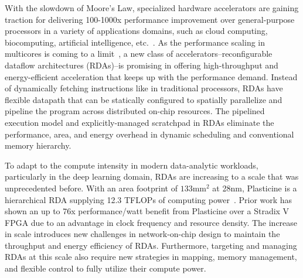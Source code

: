
With the slowdown of Moore’s Law, specialized hardware accelerators are gaining traction
for delivering 100-1000x performance improvement over general-purpose
processors in a variety of applications domains, such as cloud computing, biocomputing, 
artificial intelligence, etc.~\cite{fpgacloudsurvey,bioaccel,genomicaccel}.
As the performance scaling in multicores is coming to a limit~\cite{multicorescale}, a new
class of accelerators--reconfigurable dataflow architectures (RDAs)--is promising in 
offering high-throughput and energy-efficient acceleration that keeps up with the performance demand.
Instead of dynamically fetching instructions like in traditional processors, RDAs have flexible datapath 
that can be statically configured to spatially parallelize and pipeline the program across
distributed on-chip resources. 
The pipelined execution model and explicitly-managed scratchpad in RDAs eliminate
the performance, area, and energy overhead in dynamic scheduling and conventional memory hierarchy.

To adapt to the compute intensity in modern data-analytic workloads, particularly in the deep learning
domain, RDAs are increasing to a scale that was unprecedented before.
With an area footprint of $133\text{mm}^2$ at 28nm, 
Plasticine is a hierarchical RDA supplying 12.3 TFLOPs of computing power~\cite{plasticine}.
Prior work has shown an up to 76x performance/watt benefit from Plasticine over a Stradix V FPGA 
due to an advantage in clock frequency and resource density.
The increase in scale introduces new challenges in network-on-chip design to maintain 
the throughput and energy efficiency of RDAs.
Furthermore, targeting and managing RDAs at this scale also require new strategies in mapping, 
memory management, and flexible control to fully utilize their compute power. 

